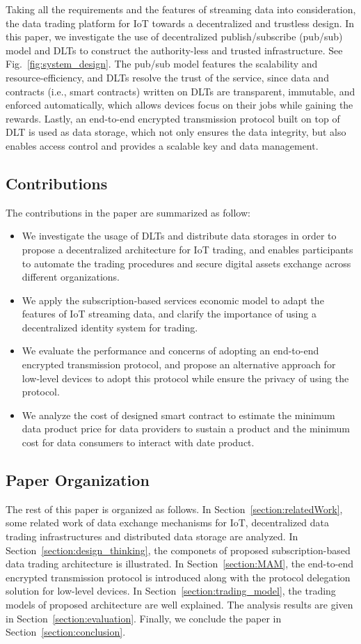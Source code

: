 \documentclass[conference]{IEEEtran}
\begin{document}
Taking all the requirements and the features of streaming data into consideration, the data trading platform for IoT towards a decentralized and trustless design. In this paper, we investigate the use of decentralized publish/subscribe (pub/sub) model and DLTs to construct the authority-less and trusted infrastructure. See Fig.~\ref{fig:system_design}. The pub/sub model features the scalability and resource-efficiency, and DLTs resolve the trust of the service, since data and contracts (i.e., smart contracts) written on DLTs are transparent, immutable, and enforced automatically, which allows devices focus on their jobs while gaining the rewards. Lastly, an end-to-end encrypted transmission protocol built on top of DLT is used as data storage, which not only ensures the data integrity, but also enables access control and provides a scalable key and data management.

\subsection{Contributions}
The contributions in the paper are summarized as follow:
\begin{itemize}
	\item We investigate the usage of DLTs and distribute data storages in order to propose a decentralized architecture for IoT trading, and enables participants to automate the trading procedures and secure digital assets exchange across different organizations.
	\item We apply the subscription-based services economic model to adapt the features of IoT streaming data, and clarify the importance of using a decentralized identity system for trading.
	\item We evaluate the performance and concerns of adopting an end-to-end encrypted transmission protocol, and propose an alternative approach for low-level devices to adopt this protocol while ensure the privacy of using the protocol.
	\item We analyze the cost of designed smart contract to estimate the minimum data product price for data providers to sustain a product and the minimum cost for data consumers to interact with date product.
\end{itemize}


\subsection{Paper Organization}
The rest of this paper is organized as follows. In Section~\ref{section:relatedWork}, some related work of data exchange mechanisms for IoT, decentralized data trading infrastructures and distributed data storage are analyzed. In Section~\ref{section:design_thinking}, the componets of proposed subscription-based data trading architecture is illustrated. In Section~\ref{section:MAM}, the end-to-end encrypted transmission protocol is introduced along with the protocol delegation solution for low-level devices. In Section~\ref{section:trading_model}, the trading models of proposed architecture are well explained. The analysis results are given in Section~\ref{section:evaluation}. Finally, we conclude the paper in Section~\ref{section:conclusion}.
\end{document}
